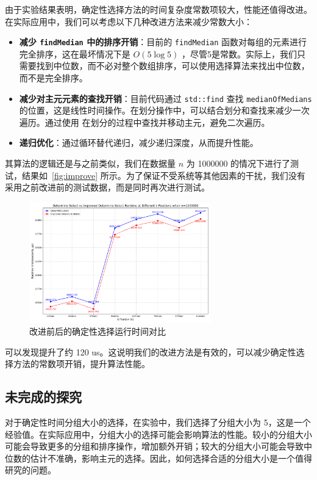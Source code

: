 由于实验结果表明，确定性选择方法的时间复杂度常数项较大，性能还值得改进。在实际应用中，我们可以考虑以下几种改进方法来减少常数大小：\begin{itemize}
    \item \textbf{减少 \texttt{findMedian} 中的排序开销}：目前的 \texttt{findMedian} 函数对每组的元素进行完全排序，这在最坏情况下是 $O(5 \log 5)$ ，尽管5是常数。实际上，我们只需要找到中位数，而不必对整个数组排序，可以使用选择算法来找出中位数，而不是完全排序。
    \item \textbf{减少对主元元素的查找开销}：目前代码通过 \texttt{std::find} 查找 \texttt{medianOfMedians} 的位置，这是线性时间操作。在划分操作中，可以结合划分和查找来减少一次遍历。通过使用  在划分的过程中查找并移动主元，避免二次遍历。
    \item \textbf{递归优化}：通过循环替代递归，减少递归深度，从而提升性能。
\end{itemize}

其算法的逻辑还是与之前类似，我们在数据量 $n$ 为 1000000 的情况下进行了测试，结果如~\autoref{fig:improve} 所示。为了保证不受系统等其他因素的干扰，我们没有采用之前改进前的测试数据，而是同时再次进行测试。
\begin{figure}[htbp]
    \centering
    \includegraphics[width=0.7\textwidth]{../figure/determine_compare_1000000.png}
    \caption{改进前后的确定性选择运行时间对比}
    \label{fig:improve}
\end{figure}

可以发现提升了约 120 us。这说明我们的改进方法是有效的，可以减少确定性选择方法的常数项开销，提升算法性能。

\subsection{未完成的探究}

对于确定性时间分组大小的选择，在实验中，我们选择了分组大小为 5，这是一个经验值。在实际应用中，分组大小的选择可能会影响算法的性能。较小的分组大小可能会导致更多的分组和排序操作，增加额外开销；较大的分组大小可能会导致中位数的估计不准确，影响主元的选择。因此，如何选择合适的分组大小是一个值得研究的问题。

